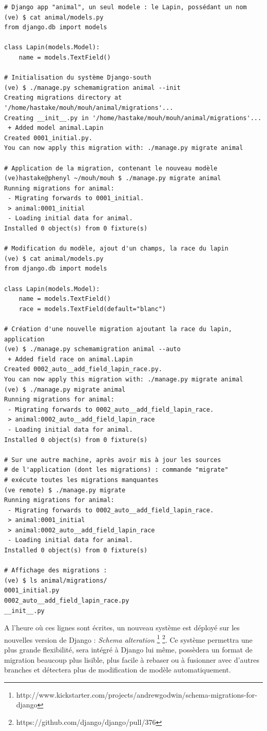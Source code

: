 \documentclass[a4paper,12pt]{article}
\begin{document}
\begin{verbatim}
# Django app "animal", un seul modele : le Lapin, possédant un nom
(ve) $ cat animal/models.py
from django.db import models

class Lapin(models.Model):
    name = models.TextField()

# Initialisation du système Django-south
(ve) $ ./manage.py schemamigration animal --init
Creating migrations directory at '/home/hastake/mouh/mouh/animal/migrations'...
Creating __init__.py in '/home/hastake/mouh/mouh/animal/migrations'...
 + Added model animal.Lapin
Created 0001_initial.py.
You can now apply this migration with: ./manage.py migrate animal

# Application de la migration, contenant le nouveau modèle
(ve)hastake@phenyl ~/mouh/mouh $ ./manage.py migrate animal
Running migrations for animal:
 - Migrating forwards to 0001_initial.
 > animal:0001_initial
 - Loading initial data for animal.
Installed 0 object(s) from 0 fixture(s)

# Modification du modèle, ajout d'un champs, la race du lapin
(ve) $ cat animal/models.py
from django.db import models

class Lapin(models.Model):
    name = models.TextField()
    race = models.TextField(default="blanc")

# Création d'une nouvelle migration ajoutant la race du lapin, application
(ve) $ ./manage.py schemamigration animal --auto
 + Added field race on animal.Lapin
Created 0002_auto__add_field_lapin_race.py.
You can now apply this migration with: ./manage.py migrate animal
(ve) $ ./manage.py migrate animal
Running migrations for animal:
 - Migrating forwards to 0002_auto__add_field_lapin_race.
 > animal:0002_auto__add_field_lapin_race
 - Loading initial data for animal.
Installed 0 object(s) from 0 fixture(s)

# Sur une autre machine, après avoir mis à jour les sources
# de l'application (dont les migrations) : commande "migrate"
# exécute toutes les migrations manquantes
(ve remote) $ ./manage.py migrate
Running migrations for animal:
 - Migrating forwards to 0002_auto__add_field_lapin_race.
 > animal:0001_initial
 > animal:0002_auto__add_field_lapin_race
 - Loading initial data for animal.
Installed 0 object(s) from 0 fixture(s)

# Affichage des migrations : 
(ve) $ ls animal/migrations/
0001_initial.py
0002_auto__add_field_lapin_race.py
__init__.py
\end{verbatim}

A l'heure où ces lignes sont écrites, un nouveau système est déployé sur
les nouvelles version de Django : \textit{Schema alteration}
\footnote{http://www.kickstarter.com/projects/andrewgodwin/schema-migrations-for-django}
\footnote{https://github.com/django/django/pull/376}. Ce système permettra
une plus grande flexibilité, sera intégré à Django lui même, possèdera un
format de migration beaucoup plus lisible, plus facile à rebaser ou à
fusionner avec d'autres branches et détectera plus de modification de modèle
automatiquement.
\end{document}
